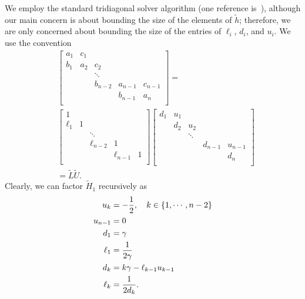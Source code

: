 We employ the standard tridiagonal solver algorithm
(one reference is~\cite[Chapter 9]{HighamASNA}),
although our main concern is about
bounding the size of the elements of $\tilde{h}$;
therefore, we are only concerned
about bounding the size of the entries of $\ell_{i}$, $d_{i}$, and $u_{i}$.
We use the convention
%
\begin{align}
    &\begin{bmatrix}
        a_{1} & c_{1} & \\
        b_{1} & a_{2} & c_{2} & \\
              &       & \ddots&       & \\
              &       &b_{n-2}&a_{n-1}&c_{n-1} \\
              &       &       &b_{n-1}& a_{n}  \\
    \end{bmatrix} = \nonumber\\
    &\begin{bmatrix}
        1 &       & \\
        \ell_{1} & 1 &       & \\
              &       & \ddots&       & \\
              &       &\ell_{n-2}&  1    &   \\
              &       &       &\ell_{n-1}& 1 \\
    \end{bmatrix}
    \begin{bmatrix}
        d_{1} & u_{1} & \\
              & d_{2} & u_{2} & \\
              &       & \ddots&       & \\
              &       &       &d_{n-1}& u_{n-1}\\
              &       &       &       & d_{n}  \\
    \end{bmatrix} \nonumber\\
    &= \widetilde{L}\widetilde{U}.
\end{align}
%
Clearly, we can factor $\widetilde{H}_{1}$ recursively as
%
\begin{align}
    u_{k} &= -\frac{1}{2},\quad k\in\left\{ 1,\cdots,n-2 \right\} \nonumber\\
    u_{n-1} &= 0 \nonumber\\
    d_{1} &= \gamma \nonumber\\
    \ell_{1} &= \frac{1}{2\gamma} \nonumber\\
    d_{k} &= k\gamma - \ell_{k-1}u_{k-1} \nonumber\\
    \ell_{k} &= \frac{1}{2d_{k}}.
    \label{ode:h1_inv_defs}
\end{align}

